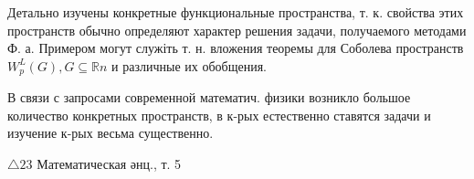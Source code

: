 \documentclass[10pt]{article}
\begin{document}
Детально изучены конкретные функциональные пространства, т. к. свойства этих пространств обычно определяют характер решения задачи, получаемого методами Ф. а. Примером могут служіть т. н. вложения теоремы для Соболева пространств $W_{p}^{L}(G), G \subseteq \mathbb{R} n$ и различные их обобщения.



В связи с запросами современной математич. физики возникло большое количество конкретных пространств, в к-рых естественно ставятся задачи и изучение к-рых весьма существенно.



$\triangle 23$ Математическая әнц., т. 5
\end{document}
